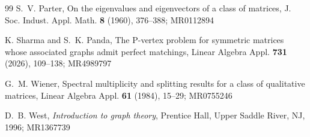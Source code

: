 \documentclass[12pt,reqno]{amsart}
\theoremstyle{definition}
\numberwithin{equation}{subsection}
\numberwithin{equation}{section}
\begin{document}
\begin{thebibliography}{99}
 S.~V. Parter, On the eigenvalues and eigenvectors of a class of matrices, J. Soc. Indust. Appl. Math. {\bf 8} (1960), 376--388; MR0112894


 K. Sharma and S.~K. Panda, The P-vertex problem for symmetric matrices whose associated graphs admit perfect matchings, Linear Algebra Appl. {\bf 731} (2026), 109--138; MR4989797

 G.~M. Wiener, Spectral multiplicity and splitting results for a class of qualitative matrices, Linear Algebra Appl. {\bf 61} (1984), 15--29; MR0755246

D.~B. West, {\it Introduction to graph theory}, Prentice Hall, Upper Saddle River, NJ, 1996; MR1367739

\end{thebibliography}
\end{document}
